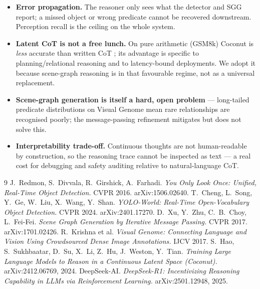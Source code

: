 \documentclass[10pt,letterpaper]{article}
\begin{document}
\begin{itemize}
  \item \textbf{Error propagation.} The reasoner only sees what the detector and SGG report; a
        missed object or wrong predicate cannot be recovered downstream. Perception recall is the
        ceiling on the whole system.
  \item \textbf{Latent CoT is not a free lunch.} On pure arithmetic (GSM8k) Coconut is \emph{less}
        accurate than written CoT \cite{hao2024}; its advantage is specific to planning/relational
        reasoning and to latency-bound deployments. We adopt it because scene-graph reasoning is in
        that favourable regime, not as a universal replacement.
  \item \textbf{Scene-graph generation is itself a hard, open problem} --- long-tailed predicate
        distributions on Visual Genome \cite{krishna2017} mean rare relationships are recognised
        poorly; the message-passing refinement \cite{xu2017} mitigates but does not solve this.
  \item \textbf{Interpretability trade-off.} Continuous thoughts are not human-readable by
        construction, so the reasoning trace cannot be inspected as text --- a real cost for
        debugging and safety auditing relative to natural-language CoT.
\end{itemize}

\begin{thebibliography}{9}
 J.~Redmon, S.~Divvala, R.~Girshick, A.~Farhadi.
  \emph{You Only Look Once: Unified, Real-Time Object Detection.} CVPR 2016. arXiv:1506.02640.
 T.~Cheng, L.~Song, Y.~Ge, W.~Liu, X.~Wang, Y.~Shan.
  \emph{YOLO-World: Real-Time Open-Vocabulary Object Detection.} CVPR 2024. arXiv:2401.17270.
 D.~Xu, Y.~Zhu, C.~B.~Choy, L.~Fei-Fei.
  \emph{Scene Graph Generation by Iterative Message Passing.} CVPR 2017. arXiv:1701.02426.
 R.~Krishna et al.
  \emph{Visual Genome: Connecting Language and Vision Using Crowdsourced Dense Image Annotations.}
  IJCV 2017.
 S.~Hao, S.~Sukhbaatar, D.~Su, X.~Li, Z.~Hu, J.~Weston, Y.~Tian.
  \emph{Training Large Language Models to Reason in a Continuous Latent Space (Coconut).}
  arXiv:2412.06769, 2024.
 DeepSeek-AI.
  \emph{DeepSeek-R1: Incentivizing Reasoning Capability in LLMs via Reinforcement Learning.}
  arXiv:2501.12948, 2025.
\end{thebibliography}
\end{document}
